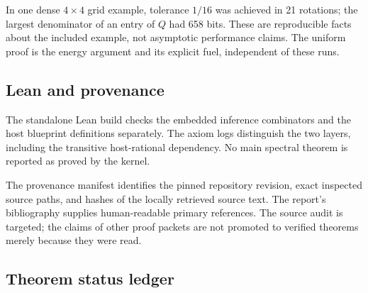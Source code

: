 In one dense $4\times4$ grid example, tolerance $1/16$ was achieved in 21 rotations; the largest denominator of an entry of $Q$ had 658 bits. These are reproducible facts about the included example, not asymptotic performance claims. The uniform proof is the energy argument and its explicit fuel, independent of these runs.

\subsection{Lean and provenance}

The standalone Lean build checks the embedded inference combinators and the host blueprint definitions separately. The axiom logs distinguish the two layers, including the transitive host-rational  dependency. No main spectral theorem is reported as proved by the kernel.

The provenance manifest identifies the pinned repository revision, exact inspected source paths, and hashes of the locally retrieved source text. The report's bibliography supplies human-readable primary references. The source audit is targeted; the claims of other proof packets are not promoted to verified theorems merely because they were read.

\subsection{Theorem status ledger}

